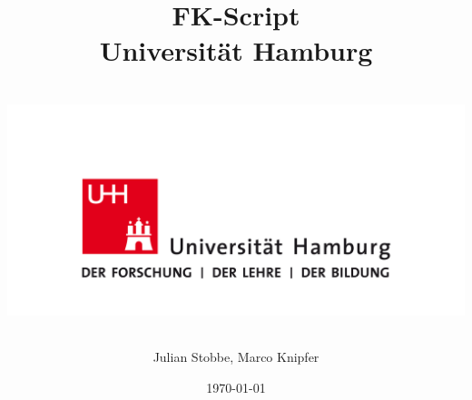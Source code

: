 \documentclass[12pt]{report}
\title{%
{FK-Script}\\
{\large Universit\"at Hamburg}\\~\\
{\includegraphics[width = \linewidth]{figures/UHHLogo.pdf}
}
\author{Julian Stobbe, Marco Knipfer}
}
\date{\today}
\begin{document}
\begin{titlepage}
    \maketitle
\end{titlepage}
\end{document}
